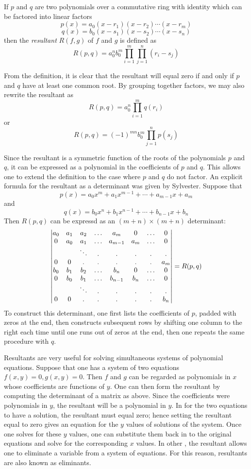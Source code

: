 \documentclass[12pt]{article}
\begin{document}
If $p$ and $q$ are two polynomials over a commutative ring with identity which can be factored into linear factors
 $$p(x) = a_0 (x - r_1) (x - r_2) \cdots (x - r_m)$$
 $$q(x) = b_0 (x - s_1) (x - s_2) \cdots (x - s_n)$$
then the \emph{resultant} $R(f,g)$ of $f$ and $g$ is defined as
 $$R(p,q) = a_0^n b_0^m \prod_{i=1}^m \prod_{j=1}^n (r_i - s_j)$$

From the definition, it is clear that the resultant will equal zero if and only if $p$ and $q$ have at least one common root.  By grouping together factors, we may also rewrite the resultant as
 $$R(p,q) = a_0^n \prod_{i=1}^m q(r_i)$$
or
 $$R(p,q) = (-1)^{mn} b_0^m \prod_{j=1}^n p(s_j)$$

Since the resultant is a symmetric function of the roots of the polynomials $p$ and $q$, it can be expressed as a polynomial in the coefficients of $p$ and $q$.  This allows one to extend the definition to the case where $p$ and $q$ do not factor.  An explicit formula for the resultant as a determinant was given by Sylvester.  Suppose that
 $$p(x) = a_0 x^m + a_1 x^{m-1} + \cdots + a_{m-1} x + a_m$$
and
 $$q(x) = b_0 x^n + b_1 x^{n-1} + \cdots + b_{n-1} x + b_n$$
Then $R(p,q)$ can be expressd as an $(m+n) \times (m+n)$ determinant:
$$\left| \begin {matrix}
a_0 & a_1 & a_2 & \ldots & a_m & 0 & \ldots & 0 \cr
0 & a_0 & a_1 & \ldots & a_{m-1} & a_m & \ldots & 0 \cr
& & \ddots & . & . & . & . & . \cr
0 & 0 & . & . & . & . & . & a_m \cr
b_0 & b_1 & b_2 & \ldots & b_n & 0 & \ldots & 0 \cr
0 & b_0 & b_1 & \ldots & b_{n-1} & b_n & \ldots & 0 \cr
& & \ddots & . & . & . & . & . \cr
0 & 0 & . & . & . & . & . &  b_n \cr
\end{matrix} \right| = R(p,q)$$
To construct this determinant, one first lists the coefficients of $p$, padded with zeros at the end, then constructs subsequent rows by shifting one column to the right each time until one runs out of zeros at the end, then one repeats the same procedure with $q$.

Resultants are very useful for solving simultaneous systems of polynomial equations.  Suppose that one has a system of two equations $f(x,y) = 0, g(x,y) = 0$.  Then $f$  and $g$ can be regarded as polynomials in $x$ whose coefficients are functions of $y$.  One can then form the resultant by computing the determinant of a matrix as above.  Since the coefficients were polynomials in $y$, the resultant will be a polynomial in $y$.  In  for the two equations to have a solution, the resultant must equal zero; hence setting the resultant equal to zero gives an equation for the $y$ values of solutions of the system.  Once one solves for these $y$ values, one can substitute them back in to the original equations and solve for the corresponding $x$ values.  In other , the resultant allows one to eliminate a variable from a system of equations.  For this reason, resultants are also known as eliminants.
\end{document}
